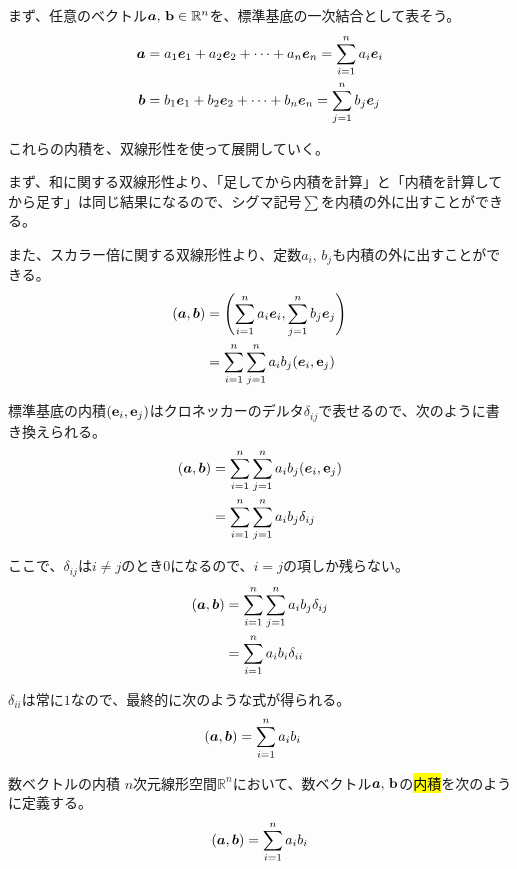 \documentclass[../../imaging-math]{subfiles}
\begin{document}
\br

まず、任意のベクトル$\vb*{a},\, \vb{b} \in \mathbb{R}^n$を、標準基底の一次結合として表そう。
\begin{align*}
  \vb*{a} & = a_1 \vb*{e}_1 + a_2 \vb*{e}_2 + \cdots + a_n \vb*{e}_n = \sum_{i=1}^n a_i \vb*{e}_i \\
  \vb*{b} & = b_1 \vb*{e}_1 + b_2 \vb*{e}_2 + \cdots + b_n \vb*{e}_n = \sum_{j=1}^n b_j \vb*{e}_j
\end{align*}

これらの内積を、双線形性を使って展開していく。

まず、和に関する双線形性より、「足してから内積を計算」と「内積を計算してから足す」は同じ結果になるので、シグマ記号$\sum$を内積の外に出すことができる。

また、スカラー倍に関する双線形性より、定数$a_i, \, b_j$も内積の外に出すことができる。
\begin{align*}
  (\vb*{a}, \vb*{b}) & = \Biggl( \sum_{i=1}^n a_i \vb*{e}_i, \sum_{j=1}^n b_j \vb*{e}_j \Biggr) \\
                     & = \sum_{i=1}^n \sum_{j=1}^n a_i b_j (\vb*{e}_i, \vb{e}_j)
\end{align*}

標準基底の内積$(\vb{e}_i, \vb{e}_j)$はクロネッカーのデルタ$\delta_{ij}$で表せるので、次のように書き換えられる。
\begin{align*}
  (\vb*{a}, \vb*{b}) & = \sum_{i=1}^n \sum_{j=1}^n a_i b_j (\vb*{e}_i, \vb{e}_j) \\
                     & = \sum_{i=1}^n \sum_{j=1}^n a_i b_j \delta_{ij}
\end{align*}

ここで、$\delta_{ij}$は$i \neq j$のとき$0$になるので、$i = j$の項しか残らない。
\begin{align*}
  (\vb*{a}, \vb*{b}) & = \sum_{i=1}^n \sum_{j=1}^n a_i b_j \delta_{ij} \\
                     & = \sum_{i=1}^n a_i b_i \delta_{ii}
\end{align*}

$\delta_{ii}$は常に$1$なので、最終的に次のような式が得られる。
\begin{align*}
  (\vb*{a}, \vb*{b}) & = \sum_{i=1}^n a_i b_i
\end{align*}

\begin{definition}{数ベクトルの内積}
  \titlegap
  $n$次元線形空間$\mathbb{R}^n$において、数ベクトル$\vb*{a},\, \vb{b}$の\hl{内積}を次のように定義する。
  \Large
  \begin{equation*}
    (\vb*{a}, \vb*{b}) = \sum_{i=1}^n a_i b_i
  \end{equation*}
\end{definition}
\end{document}
